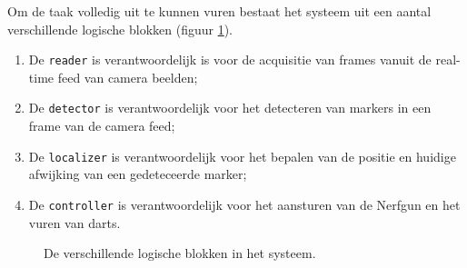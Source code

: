 \pagebreak

Om de taak volledig uit te kunnen vuren bestaat het systeem uit een aantal
verschillende logische blokken (figuur \ref{fig:ipo-main}).

\begin{enumerate}
    \item De \texttt{reader} is verantwoordelijk is voor de acquisitie
        van frames vanuit de real-time feed van camera beelden;
    \item De \texttt{detector} is verantwoordelijk voor het detecteren van
        markers in een frame van de camera feed;
    \item De \texttt{localizer} is verantwoordelijk voor het bepalen van de
        positie en huidige afwijking van een gedeteceerde marker;
    \item De \texttt{controller} is verantwoordelijk voor het aansturen van
        de Nerfgun en het vuren van darts.
\end{enumerate}

\begin{figure}[H]
    \begin{center}
        
    \end{center}
    \caption{De verschillende logische blokken in het \autonerf systeem.}
    \label{fig:ipo-main}
\end{figure}
